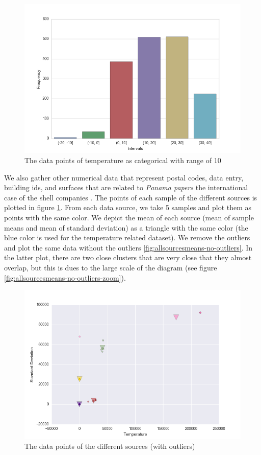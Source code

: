 \documentclass{article}
\begin{document}
\begin{figure}[!ht]
  \caption{The data points of temperature as categorical with range of 10}
  \centering
    \includegraphics[width=1.0\textwidth]{range10}
\end{figure}

We also gather other numerical data that represent postal codes, data entry, building ids, and surfaces that are related to \textit{Panama papers} the international case of the shell companies \cite{panama}. The points of each sample of the different sources is plotted in figure \ref{fig:allsourcesmeans-with-outliers}. From each data source, we take 5 samples and plot them as points with the same color. We depict the mean of each source (mean of sample means and mean of standard deviation) as a triangle with the same color (the blue color is used for the temperature related dataset). We remove the outliers and plot the same data without the outliers \ref{fig:allsourcesmeans-no-outliers}. In the latter plot, there are two close clusters that are very close that they almost overlap, but this is dues to the large scale of the diagram (see figure \ref{fig:allsourcesmeans-no-outliers-zoom}).

\begin{figure}[!ht]
  \caption{The data points of the different sources (with outliers)}
  \label{fig:allsourcesmeans-with-outliers}
  \centering
    \includegraphics[width=1.0\textwidth]{allsourcesmeans_with_outliers}
\end{figure}
\end{document}
